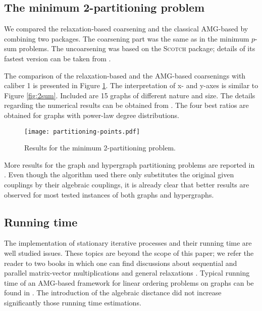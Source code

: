 \documentclass[final]{siamltex}
\newcommand{\scotch}{\textsc{Scotch}}
\begin{document}
\subsection{The minimum 2-partitioning problem}
\par We compared the relaxation-based coarsening and the classical AMG-based
 by combining two packages. The coarsening part was
 the same as in the minimum $p$-sum problems. The
uncoarsening was based on the \scotch{} package; details of
its fastest version can be taken from \cite{cheval-mlpartcompar}.
\par The comparison of the relaxation-based and the AMG-based coarsenings with caliber
1 is presented in Figure \ref{fig:partitioning}. The
interpretation of x- and y-axes is similar to Figure
\ref{fig:2sum}.
Included are 15 graphs of different nature and size. The details
regarding the numerical results can be obtained from
\cite{safroproj}. The four best ratios are obtained for graphs with
power-law degree distributions.
\begin{figure}[h]
\centering
\texttt{[image: partitioning-points.pdf]}
\caption{Results for the minimum 2-partitioning problem.}\label{fig:partitioning}
\end{figure}
More results for the graph and hypergraph partitioning problems are reported in \cite{chen-safro-algdist-full}. Even though the algorithm used there only substitutes the original given couplings by their algebraic couplings, it is already clear that better results are observed for most tested instances of both graphs and hypergraphs.
\subsection{Running time}
\par The implementation of stationary iterative processes and their running time are well studied issues. These topics are beyond the scope of this paper; we refer the reader to two books in which one can find discussions about sequential and parallel matrix-vector multiplications and general relaxations \cite{Grama,heath}. Typical running time of an AMG-based framework for linear ordering problems on graphs can be found in \cite{safro2003,safro2004,safro2005}. The introduction of the algebraic disctance did not increase significantly those running time estimations.
\end{document}
